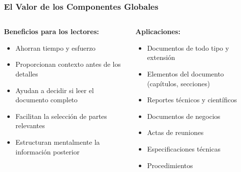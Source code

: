 \documentclass{beamer}
\begin{document}
\begin{frame}
\frametitle{El Valor de los Componentes Globales}

\begin{columns}[T]
\begin{column}{0.48\textwidth}
\textbf{Beneficios para los lectores:}
\begin{itemize}
    \item Ahorran tiempo y esfuerzo
    \item Proporcionan contexto antes de los detalles
    \item Ayudan a decidir si leer el documento completo
    \item Facilitan la selección de partes relevantes
    \item Estructuran mentalmente la información posterior
\end{itemize}
\end{column}

\begin{column}{0.48\textwidth}
\textbf{Aplicaciones:}
\begin{itemize}
    \item Documentos de todo tipo y extensión
    \item Elementos del documento (capítulos, secciones)
    \item Reportes técnicos y científicos
    \item Documentos de negocios
    \item Actas de reuniones
    \item Especificaciones técnicas
    \item Procedimientos
\end{itemize}
\end{column}
\end{columns}
\end{frame}
\end{document}
